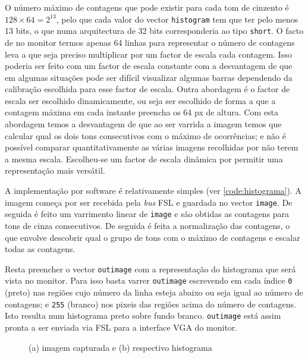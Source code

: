 \documentclass[a4paper,12pt]{article}
\begin{document}
O número máximo de contagens que pode existir para cada tom de cinzento é $128\times64 = 2^{13}$, pelo que cada valor do vector \texttt{histogram} tem que ter pelo menos 13 bits, o que numa arquitectura de 32 bits corresponderia ao tipo \texttt{short}. O facto de no monitor termos apenas 64 linhas para representar o número de contagens leva a que seja preciso multiplicar por um factor de escala cada contagem. Isso poderia ser feito com um factor de escala constante com a desvantagem de que em algumas situações pode ser difícil visualizar algumas barras dependendo da calibração escolhida para esse factor de escala. Outra abordagem é o factor de escala ser escolhido dinamicamente, ou seja ser escolhido de forma a que a contagem máxima em cada instante preencha os 64 px de altura. Com esta abordagem temos a desvantagem de que ao ser varrida a imagem temos que calcular qual os dois tons consecutivos com o máximo de ocorrências; e não é possível comparar quantitativamente as várias imagens recolhidas por não terem a mesma escala. Escolheu-se um factor de escala dinâmica por permitir uma representação mais versátil.

A implementação por software é relativamente simples (ver \autoref{code:histograma}). A imagem começa por ser recebida pela \textit{bus} FSL e guardada no vector \texttt{image}. De seguida é feito um varrimento linear de \texttt{image} e são obtidas as contagens para tons de cinza consecutivos. De seguida é feita a normalização das contagens, o que envolve descobrir qual o grupo de tons com o máximo de contagens e escalar todas as contagens.

Resta preencher o vector \texttt{outimage} com a representação do histograma que será vista no monitor. Para isso basta varrer \texttt{outimage} escrevendo em cada índice \texttt{0} (preto) nas regiões cujo número da linha esteja abaixo ou seja igual ao número de contagens; e \texttt{255} (branco) nos pixeis das regiões acima do número de contagens. Isto resulta num histograma preto sobre fundo branco. \texttt{outimage} está assim pronta a ser enviada via FSL para a interface VGA do monitor.

\begin{figure}[h]
	\centering
	\begin{subfigure}[b]{0.40\textwidth}
		\centering
		\caption{}
	\end{subfigure}
	\begin{subfigure}[b]{0.40\textwidth}
		\centering
		\caption{}
	\end{subfigure}
	\caption{(a) imagem capturada e (b) respectivo histograma}
	\label{fig:histograma}
\end{figure}
\end{document}
